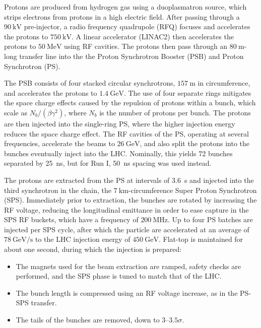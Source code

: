 Protons are produced from hydrogen gas using a duoplasmatron source, which strips electrons from protons in a high electric field. After passing through a $\SI{90}{\kilo\volt}$ pre-injector, a radio frequency quadrupole (RFQ) focuses and accelerates the protons to $\SI{750}{\kilo\volt}$. A linear accelerator (LINAC2) then accelerates the protons to $\SI{50}{\mega\electronvolt}$ using RF cavities. The protons then pass through an $\SI{80}{\meter}$-long transfer line into the the Proton Synchrotron Booster (PSB) and Proton Synchrotron (PS). 

The PSB consists of four stacked circular synchrotrons, $\SI{157}{\meter}$ in circumference, and accelerates the protons to $\SI{1.4}{\giga\electronvolt}$. The use of four separate rings mitigates the space charge effects caused by the repulsion of protons within a bunch, which scale as $N_b/(\beta\gamma^2)$, where $N_b$ is the number of protons per bunch. The protons are then injected into the single-ring PS, where the higher injection energy reduces the space charge effect. The RF cavities of the PS, operating at several frequencies, accelerate the beams to $\SI{26}{\giga\electronvolt}$, and also split the protons into the bunches eventually inject into the LHC. Nominally, this yields 72 bunches separated by \SI{25}{\nano\second}, but for Run I, \SI{50}{\nano\second} spacing was used instead. 

The protons are extracted from the PS at intervals of \SI{3.6}{\second} and injected into the third synchrotron in the chain, the $\SI{7}{\kilo\meter}$-circumference Super Proton Synchrotron (SPS). Immediately prior to extraction, the bunches are rotated by increasing the RF voltage, reducing the longitudinal emittance in order to ease capture in the SPS RF buckets, which have a frequency of $\SI{200}{\mega\hertz}$.  Up to four PS batches are injected per SPS cycle, after which the particle are accelerated at an average of $\SI[per-mode=symbol]{78}{\giga\electronvolt\per\second}$ to the LHC injection energy of $\SI{450}{\giga\electronvolt}$. Flat-top is maintained for about one second, during which the injection is prepared:

\begin{itemize}
	\item The magnets used for the beam extraction are ramped, safety checks are performed, and the SPS phase is tuned to match that of the LHC.
	\item The bunch length is compressed using an RF voltage increase, as in the PS-SPS transfer.
	\item The tails of the bunches are removed, down to $3$--$3.5\sigma$.
\end{itemize}

